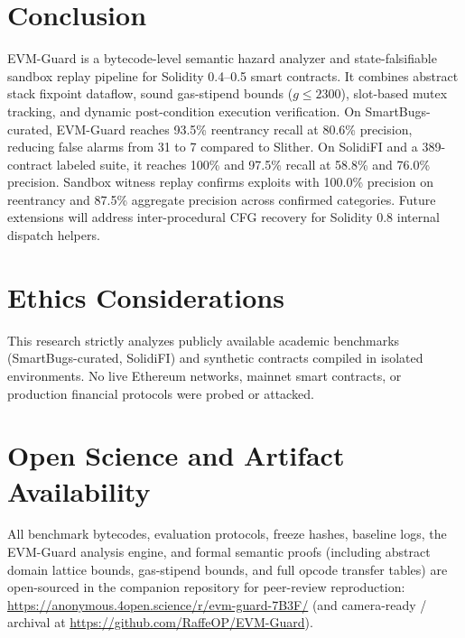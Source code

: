 \documentclass[conference]{IEEEtran}
\begin{document}
\section{Conclusion}\label{sec:conclusion}
EVM-Guard is a bytecode-level semantic hazard analyzer and state-falsifiable sandbox replay pipeline for Solidity 0.4--0.5 smart contracts. It combines abstract stack fixpoint dataflow, sound gas-stipend bounds ($g \le 2300$), slot-based mutex tracking, and dynamic post-condition execution verification. On SmartBugs-curated, EVM-Guard reaches 93.5\% reentrancy recall at 80.6\% precision, reducing false alarms from 31 to 7 compared to Slither. On SolidiFI and a 389-contract labeled suite, it reaches 100\% and 97.5\% recall at 58.8\% and 76.0\% precision. Sandbox witness replay confirms exploits with 100.0\% precision on reentrancy and 87.5\% aggregate precision across confirmed categories. Future extensions will address inter-procedural CFG recovery for Solidity 0.8 internal dispatch helpers.

\section*{Ethics Considerations}\label{sec:ethics}
This research strictly analyzes publicly available academic benchmarks (SmartBugs-curated, SolidiFI) and synthetic contracts compiled in isolated environments. No live Ethereum networks, mainnet smart contracts, or production financial protocols were probed or attacked.

\section*{Open Science and Artifact Availability}\label{sec:artifacts}
All benchmark bytecodes, evaluation protocols, freeze hashes, baseline logs, the EVM-Guard analysis engine, and formal semantic proofs (including abstract domain lattice bounds, gas-stipend bounds, and full opcode transfer tables) are open-sourced in the companion repository for peer-review reproduction: \url{https://anonymous.4open.science/r/evm-guard-7B3F/} (and camera-ready / archival at \url{https://github.com/RaffeOP/EVM-Guard}).

\balance

\begingroup
\renewcommand{\IEEEbibitemsep}{-0.4pt}

\endgroup
\end{document}
